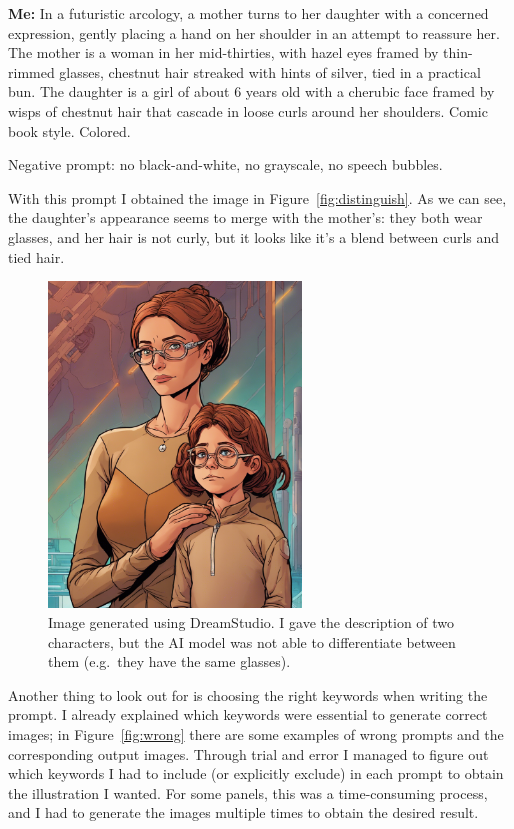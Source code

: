 \documentclass[a4paper,11pt]{article}
\newenvironment{shadedquotation3}
    {\colorlet{shadecolor}{Purple!15}\begin{shaded*}
    \quoting[leftmargin=1cm, rightmargin=1cm, vskip=0pt]
    }
    {\endquoting
    \end{shaded*}
}
\begin{document}
\begin{shadedquotation3}
    \textbf{Me:} In a futuristic arcology, a mother turns to her daughter with a concerned expression, gently placing a hand on her shoulder in an attempt to reassure her. The mother is a woman in her mid-thirties, with hazel eyes framed by thin-rimmed glasses, chestnut hair streaked with hints of silver, tied in a practical bun. The daughter is a girl of about 6 years old with a cherubic face framed by wisps of chestnut hair that cascade in loose curls around her shoulders. Comic book style. Colored.\smallskip 

    \noindent Negative prompt: no black-and-white, no grayscale,  no speech bubbles.
\end{shadedquotation3}

With this prompt I obtained the image in Figure~\vref{fig:distinguish}. As we can see, the daughter's appearance seems to merge with the mother's:  they both wear glasses, and her hair is not curly, but it looks like it's a blend between curls and tied hair. 

\begin{figure}[htb]
    \centering
    \includegraphics[width=0.6\textwidth]{figures/no-distinguish-between-people.png}
    \caption{Image generated using DreamStudio. I gave the description of two characters, but the AI model was not able to differentiate between them (e.g.~they have the same glasses).}
    \label{fig:distinguish}
\end{figure}

Another thing to look out for is choosing the right keywords when writing the prompt. I already explained which keywords were essential to generate correct images; in Figure~\vref{fig:wrong} there are some examples of wrong prompts and the corresponding output images. Through trial and error I managed to figure out which keywords I had to include (or explicitly exclude) in each prompt to obtain the illustration I wanted. For some panels, this was a time-consuming process, and I had to generate the images multiple times to obtain the desired result.\medskip
\end{document}
